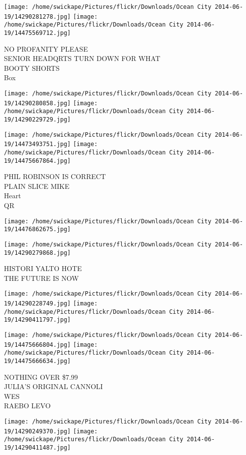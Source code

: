 \documentclass[10pt,letterpaper]{article}
\begin{document}
\texttt{[image: /home/swickape/Pictures/flickr/Downloads/Ocean City 2014-06-19/14290281278.jpg]}
\texttt{[image: /home/swickape/Pictures/flickr/Downloads/Ocean City 2014-06-19/14475569712.jpg]}

NO PROFANITY PLEASE\\
SENIOR HEADQRTS TURN DOWN FOR WHAT\\
BOOTY SHORTS\\
Box
\pagebreak

\texttt{[image: /home/swickape/Pictures/flickr/Downloads/Ocean City 2014-06-19/14290280858.jpg]}
\texttt{[image: /home/swickape/Pictures/flickr/Downloads/Ocean City 2014-06-19/14290229729.jpg]}

\texttt{[image: /home/swickape/Pictures/flickr/Downloads/Ocean City 2014-06-19/14473493751.jpg]}
\texttt{[image: /home/swickape/Pictures/flickr/Downloads/Ocean City 2014-06-19/14475667864.jpg]}

PHIL ROBINSON IS CORRECT\\
PLAIN SLICE MIKE\\
Heart\\
QR
\pagebreak

\texttt{[image: /home/swickape/Pictures/flickr/Downloads/Ocean City 2014-06-19/14476862675.jpg]}

\vspace{0.25in}
\texttt{[image: /home/swickape/Pictures/flickr/Downloads/Ocean City 2014-06-19/14290279868.jpg]}

HISTORI YALTO HOTE\\
THE FUTURE IS NOW
\pagebreak

\texttt{[image: /home/swickape/Pictures/flickr/Downloads/Ocean City 2014-06-19/14290228749.jpg]}
\texttt{[image: /home/swickape/Pictures/flickr/Downloads/Ocean City 2014-06-19/14290411797.jpg]}

\texttt{[image: /home/swickape/Pictures/flickr/Downloads/Ocean City 2014-06-19/14475666804.jpg]}
\texttt{[image: /home/swickape/Pictures/flickr/Downloads/Ocean City 2014-06-19/14475666634.jpg]}

NOTHING OVER \$7.99\\
JULIA'S ORIGINAL CANNOLI\\
WES\\
RAEBO LEVO
\pagebreak

\texttt{[image: /home/swickape/Pictures/flickr/Downloads/Ocean City 2014-06-19/14290249370.jpg]}
\texttt{[image: /home/swickape/Pictures/flickr/Downloads/Ocean City 2014-06-19/14290411487.jpg]}
\end{document}
